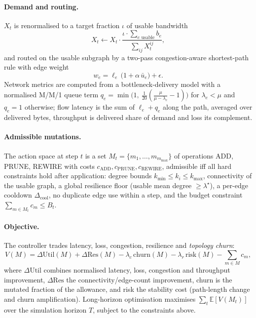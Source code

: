 \documentclass[runningheads]{llncs}
\begin{document}
\paragraph{Demand and routing.}
$X_t$ is renormalised to a target fraction $\iota$ of usable bandwidth
\begin{equation}
X_t \leftarrow X_t \cdot \frac{\iota \cdot \sum_{e \text{ usable}} b_e}{\sum_{ij} X_t^{ij}} ,
\label{eq:scale}
\end{equation}
and routed on the usable subgraph by a two-pass congestion-aware
shortest-path rule with edge weight
\begin{equation}
w_e = \ell_e\,\bigl(1 + \alpha\,\bar{u}_e\bigr) + \epsilon .
\label{eq:routing}
\end{equation}
Network metrics are computed from a bottleneck-delivery model with a
normalised M/M/1 queue term
$q_e = \min\bigr(1,\ \tfrac{1}{20}(\tfrac{\mu}{\mu-\lambda_e}-1)\bigr)$
for $\lambda_e < \mu$ and $q_e = 1$ otherwise; flow latency is the sum of
$\ell_e + q_e$ along the path, averaged over delivered bytes, throughput is
delivered share of demand and loss its complement.

\paragraph{Admissible mutations.}
The action space at step $t$ is a set
$M_t = \{m_1, \dots, m_{m_{\max}}\}$ of operations ADD, PRUNE, REWIRE with
costs $c_{\text{ADD}}, c_{\text{PRUNE}}, c_{\text{REWIRE}}$, admissible
iff all hard constraints hold after application: degree bounds
$k_{\min} \le k_i \le k_{\max}$, connectivity of the usable graph, a global
resilience floor (usable mean degree $\ge \lambda^\star$), a per-edge
cooldown $\Delta_{\text{cool}}$, no duplicate edge use within a step, and
the budget constraint $\sum_{m \in M_t} c_m \le B_t$.

\paragraph{Objective.}
The controller trades latency, loss, congestion, resilience and
\emph{topology churn}:
\begin{equation}
V(M) = \Delta\text{Util}(M) + \Delta\text{Res}(M) - \lambda_c\,\text{churn}(M)
      - \lambda_r\,\text{risk}(M) - \sum_{m \in M} c_m,
\label{eq:objective}
\end{equation}
where $\Delta\text{Util}$ combines normalised latency, loss, congestion and
throughput improvement, $\Delta\text{Res}$ the connectivity/edge-count
improvement, churn is the mutated fraction of the allowance, and risk the
stability cost (path-length change and churn amplification). Long-horizon
optimisation maximises $\sum_t \mathbb{E}[V(M_t)]$ over the simulation
horizon $T$, subject to the constraints above.
\end{document}
